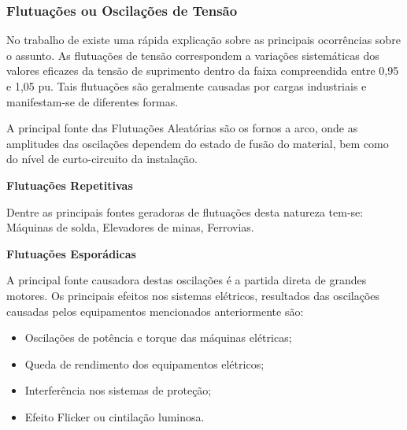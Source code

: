 \subsubsection{Flutuações ou Oscilações de Tensão}\label{qeeFluOT}
\par
No trabalho de \cite{DEL03} existe uma rápida explicação sobre as principais ocorrências sobre o assunto. As flutuações de tensão correspondem a variações sistemáticas dos valores eficazes da tensão de suprimento dentro da faixa compreendida entre 0,95 e 1,05 pu. Tais flutuações são geralmente causadas por cargas industriais e manifestam-se de diferentes formas.
\par
A principal fonte das Flutuações Aleatórias são os fornos a arco, onde as amplitudes das oscilações dependem do estado de fusão do material, bem como do nível de curto-circuito da instalação.
\par\textbf{Flutuações Repetitivas}
\par Dentre as principais fontes geradoras de flutuações desta natureza tem-se: Máquinas de solda, Elevadores de minas, Ferrovias.
\par\textbf{Flutuações Esporádicas}
\par A principal fonte causadora destas oscilações é a partida direta de grandes motores. Os principais efeitos nos sistemas elétricos, resultados das oscilações causadas pelos equipamentos mencionados anteriormente são:
\begin{itemize}
\item Oscilações de potência e torque das máquinas elétricas;
\item Queda de rendimento dos equipamentos elétricos;
\item Interferência nos sistemas de proteção;
\item Efeito Flicker ou cintilação luminosa.
\end{itemize}
